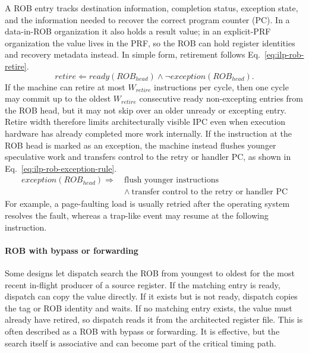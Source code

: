 A ROB entry tracks destination information, completion status, exception state, and the information needed to recover the correct program counter (PC)\@.
In a data-in-ROB organization it also holds a result value; in an explicit-PRF organization the value lives in the PRF, so the ROB can hold register identities and recovery metadata instead.
In simple form, retirement follows Eq.~\eqref{eq:ilp-rob-retire}.
\begin{equation}\label{eq:ilp-rob-retire}
    retire \Leftarrow ready(ROB_{head})\wedge \neg exception(ROB_{head}).
\end{equation}
If the machine can retire at most $W_{retire}$ instructions per cycle, then one cycle may commit up to the oldest $W_{retire}$ consecutive ready non-excepting entries from the ROB head, but it may not skip over an older unready or excepting entry.
Retire width therefore limits architecturally visible IPC even when execution hardware has already completed more work internally.
If the instruction at the ROB head is marked as an exception, the machine instead flushes younger speculative work and transfers control to the retry or handler PC, as shown in Eq.~\eqref{eq:ilp-rob-exception-rule}.
\begin{equation}\label{eq:ilp-rob-exception-rule}
    \begin{aligned}
        exception(ROB_{head}) \Rightarrow\ &\text{flush younger instructions}\\
        &\wedge\ \text{transfer control to the retry or handler PC}
    \end{aligned}
\end{equation}
For example, a page-faulting load is usually retried after the operating system resolves the fault, whereas a trap-like event may resume at the following instruction.

\paragraph{ROB with bypass or forwarding}\label{par:ilp-rob-bypass}
Some designs let dispatch search the ROB from youngest to oldest for the most recent in-flight producer of a source register.
If the matching entry is ready, dispatch can copy the value directly.
If it exists but is not ready, dispatch copies the tag or ROB identity and waits.
If no matching entry exists, the value must already have retired, so dispatch reads it from the architected register file.
This is often described as a ROB with bypass or forwarding.
It is effective, but the search itself is associative and can become part of the critical timing path.

